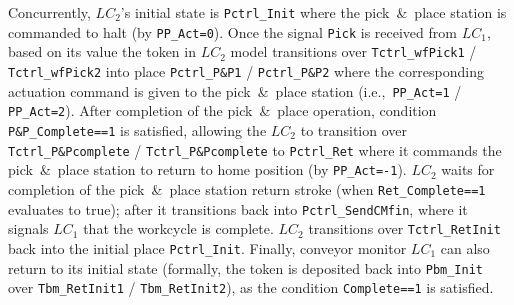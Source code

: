 \begin{example}
Concurrently, $LC_2$'s initial state is \verb!Pctrl_Init! where the pick~\&~place station is commanded to halt (by \verb!PP_Act=0!). Once the signal \verb!Pick! is received from $LC_1$, based on its value the token in $LC_2$ model transitions over \verb!Tctrl_wfPick1! / \verb!Tctrl_wfPick2! into place \verb!Pctrl_P&P1! / \verb!Pctrl_P&P2! where the corresponding actuation command is given to the pick~\&~place station (i.e.,~\verb!PP_Act=1! / \verb!PP_Act=2!). After completion of the pick~\&~place operation, condition \verb!P&P_Complete==1! is satisfied, allowing the $LC_2$ to transition over \verb!Tctrl_P&Pcomplete! / \verb!Tctrl_P&Pcomplete! to \verb!Pctrl_Ret! where it commands the pick~\&~place station to return to home position (by \verb!PP_Act=-1!). $LC_2$ waits for completion of the pick~\&~place station return stroke (when %
\verb!Ret_Complete==1! evaluates to true); after it transitions back into \verb!Pctrl_SendCMfin!, where it signals %
$LC_1$ that the workcycle is complete. $LC_2$ transitions over \verb!Tctrl_RetInit! back into the initial place \verb!Pctrl_Init!.
%
Finally, conveyor monitor $LC_1$ can also return to its initial state (formally, the token is deposited back into \verb!Pbm_Init! over \verb!Tbm_RetInit1! / \verb!Tbm_RetInit2!), as the condition \verb!Complete==1! is satisfied.\QEDE
\end{example}


